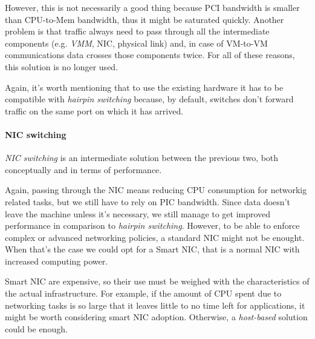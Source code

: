 \bigskip\noindent
\begin{minipage}{0.48\textwidth}
    However, this is not necessarily a good thing because PCI bandwidth is
    smaller than CPU-to-Mem bandwidth, thus it might be saturated quickly. Another
    problem is that traffic always need to pass through all the intermediate
    components (e.g. \emph{VMM}, NIC, physical link) and, in case of VM-to-VM
    communications data crosses those components twice. For all of these reasons,
    this solution is no longer used.
\end{minipage}
\begin{minipage}{0.48\textwidth}
    \centering
\end{minipage}

\bigskip\noindent
Again, it's worth mentioning that to use the existing hardware it has to be
compatible with \emph{hairpin switching} because, by default, switches don't
forward traffic on the same port on which it has arrived.

\paragraph{NIC switching}
\emph{NIC switching} is an intermediate solution between the previous two, both
conceptually and in terms of performance.

\bigskip\noindent
\begin{minipage}{0.48\textwidth}
    Again, passing through the NIC means reducing CPU consumption for networkig
    related tasks, but we still have to rely on PIC bandwidth. Since data doesn't
    leave the machine unless it's necessary, we still manage to get improved
    performance in comparison to \emph{hairpin switching}. However, to be able
    to enforce complex or advanced networking policies, a standard NIC might not
    be enought. When that's the case we could opt for a Smart NIC, that is a
    normal NIC with increased computing power.
\end{minipage}
\hfill
\begin{minipage}{0.48\textwidth}
    \centering
\end{minipage}

\bigskip\noindent
Smart NIC are expensive, so their use must be weighed with the characteristics
of the actual infrastructure. For example, if the amount of CPU spent due to
networking tasks is so large that it leaves little to no time left for
applications, it might be worth considering smart NIC adoption. Otherwise, a
\emph{host-based} solution could be enough.

